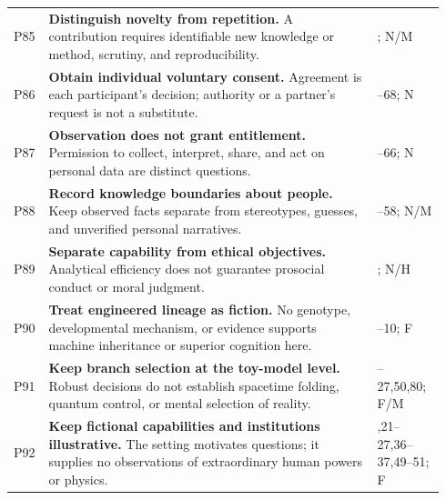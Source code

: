 \begin{longtable}{@{}>{\raggedright\arraybackslash}p{0.055\linewidth}>{\raggedright\arraybackslash}p{0.735\linewidth}>{\raggedright\arraybackslash}p{0.15\linewidth}@{}}
P85 & \textbf{Distinguish novelty from repetition.} A contribution requires identifiable new knowledge or method, scrutiny, and reproducibility. & 49; N/M\\[0.5em]
P86 & \textbf{Obtain individual voluntary consent.} Agreement is each participant's decision; authority or a partner's request is not a substitute. & 67--68; N\\[0.5em]
P87 & \textbf{Observation does not grant entitlement.} Permission to collect, interpret, share, and act on personal data are distinct questions. & 65--66; N\\[0.5em]
P88 & \textbf{Record knowledge boundaries about people.} Keep observed facts separate from stereotypes, guesses, and unverified personal narratives. & 57--58; N/M\\[0.5em]
P89 & \textbf{Separate capability from ethical objectives.} Analytical efficiency does not guarantee prosocial conduct or moral judgment. & 37; N/H\\[0.5em]
P90 & \textbf{Treat engineered lineage as fiction.} No genotype, developmental mechanism, or evidence supports machine inheritance or superior cognition here. & 9--10; F\\[0.5em]
P91 & \textbf{Keep branch selection at the toy-model level.} Robust decisions do not establish spacetime folding, quantum control, or mental selection of reality. & 21--27,50,80; F/M\\[0.5em]
P92 & \textbf{Keep fictional capabilities and institutions illustrative.} The setting motivates questions; it supplies no observations of extraordinary human powers or physics. & 4,21--27,36--37,49--51; F\\[0.5em]
\end{longtable}
\normalsize
